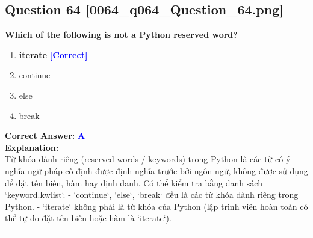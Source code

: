 \documentclass[11pt,a4paper]{article}
\begin{document}
\begin{minipage}{\textwidth}
\subsection*{Question 64 \quad \footnotesize{[0064_q064_Question_64.png]}}
\noindent \textbf{Which of the following is not a Python reserved word?}

\begin{enumerate}[label=\Alph*.]
    \item \textbf{iterate} \hfill \textcolor{blue}{\textbf{[Correct]}}
    \item continue
    \item else
    \item break
\end{enumerate}

\noindent \textbf{Correct Answer:} \textcolor{blue}{\textbf{A}} \\[4pt]
\noindent \textbf{Explanation:}\\
Từ khóa dành riêng (reserved words / keywords) trong Python là các từ có ý nghĩa ngữ pháp cố định được định nghĩa trước bởi ngôn ngữ, không được sử dụng để đặt tên biến, hàm hay định danh. Có thể kiểm tra bằng danh sách `keyword.kwlist`.\newline
\newline
- `continue`, `else`, `break` đều là các từ khóa dành riêng trong Python.\newline
- `iterate` không phải là từ khóa của Python (lập trình viên hoàn toàn có thể tự do đặt tên biến hoặc hàm là `iterate`).
\end{minipage}
\vspace{0.8cm}
\hrule
\vspace{0.5cm}
\end{document}
